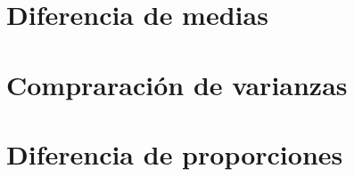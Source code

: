 \documentclass[
]{book}
\begin{document}
\hypertarget{diferencia-de-medias-1}{%
\section{Diferencia de medias}\label{diferencia-de-medias-1}}

\hypertarget{compraraciuxf3n-de-varianzas}{%
\section{Compraración de varianzas}\label{compraraciuxf3n-de-varianzas}}

\hypertarget{diferencia-de-proporciones-1}{%
\section{Diferencia de proporciones}\label{diferencia-de-proporciones-1}}

  
\end{document}
